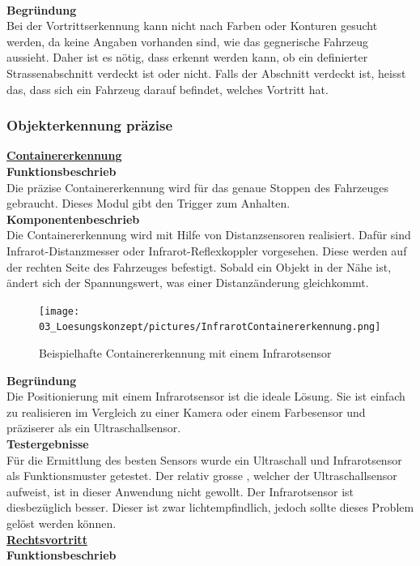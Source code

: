 \\
\textbf{Begründung}\\[0.2cm]
Bei der Vortrittserkennung kann nicht nach Farben oder Konturen gesucht werden, da keine Angaben vorhanden sind, wie das gegnerische Fahrzeug aussieht. Daher ist es nötig, dass erkennt werden kann, ob ein definierter Strassenabschnitt verdeckt ist oder nicht. Falls der Abschnitt verdeckt ist, heisst das, dass sich ein Fahrzeug darauf befindet, welches Vortritt hat.
\subsubsection{Objekterkennung präzise}
\underline{\textbf{Containererkennung}}\\[0.2cm]
\textbf{Funktionsbeschrieb}\\[0.2cm]
Die präzise Containererkennung wird für das genaue Stoppen des Fahrzeuges gebraucht. Dieses Modul gibt den Trigger zum Anhalten.\\[0.2cm]
\textbf{Komponentenbeschrieb}\\[0.2cm]
Die Containererkennung wird mit Hilfe von Distanzsensoren realisiert. Dafür sind Infrarot-Distanzmesser oder Infrarot-Reflexkoppler vorgesehen. Diese werden auf der rechten Seite des Fahrzeuges befestigt. Sobald ein Objekt in der Nähe ist, ändert sich der Spannungswert, was einer Distanzänderung gleichkommt. 
\begin{figure} [H]
	\centering
	\texttt{[image: 03\_Loesungskonzept/pictures/InfrarotContainererkennung.png]}
	\caption{Beispielhafte Containererkennung mit einem Infrarotsensor}
\end{figure}
\textbf{Begründung}\\[0.2cm]
Die Positionierung mit einem Infrarotsensor ist die ideale Lösung. Sie ist einfach zu realisieren im Vergleich zu einer Kamera oder einem Farbesensor und präziserer als ein Ultraschallsensor.\\[0.2cm]
\textbf{Testergebnisse}\\[0.2cm]
Für die Ermittlung des besten Sensors wurde ein Ultraschall und Infrarotsensor als Funktionsmuster getestet. Der relativ grosse \grqq, welcher der Ultraschallsensor aufweist, ist in dieser Anwendung nicht gewollt. Der Infrarotsensor ist diesbezüglich besser. Dieser ist zwar lichtempfindlich, jedoch sollte dieses Problem gelöst werden können.\\[0.2cm]
%
\underline{\textbf{Rechtsvortritt}} \\[0.2cm]
\textbf{Funktionsbeschrieb}\\[0.2cm]

